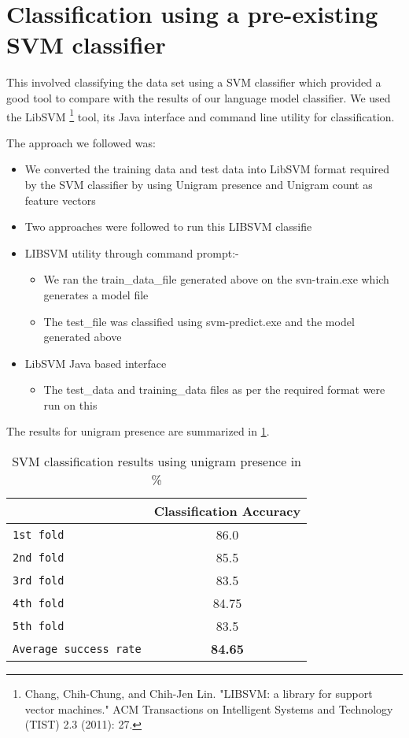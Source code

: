 \documentclass[paper=a4, fontsize=11pt]{scrartcl}
\numberwithin{equation}{section}		%
\numberwithin{figure}{section}			%
\numberwithin{table}{section}				%
\begin{document}

\section{Classification using a pre-existing SVM classifier}
This involved classifying the data set using a SVM classifier which provided a good tool to compare with the results of our language model classifier. We used the LibSVM \footnote{Chang, Chih-Chung, and Chih-Jen Lin. "LIBSVM: a library for support vector machines." ACM Transactions on Intelligent Systems and Technology (TIST) 2.3 (2011): 27.} tool, its Java interface and command line utility for classification.

The approach we followed was:
\begin {itemize}
      \item We converted the training data and test data into LibSVM format required by the SVM classifier by using Unigram presence and Unigram count as feature vectors
	\item Two approaches were followed to run this LIBSVM classifie			       
	\item LIBSVM utility through command prompt:-
        \begin{itemize}
        \item We ran the train\_data\_file generated above on the svn-train.exe which generates a model file
		\item The test\_file was classified using svm-predict.exe and the model generated above
		\end{itemize}
    \item LibSVM Java based interface
		\begin {itemize}
    	\item The test\_data and training\_data files as per the required format were run on this
       	\end {itemize}
		
\end{itemize}
    
The results for unigram presence are summarized in \ref{table:svm_uniP}.
\begin {table}[H]
\centering
\begin{tabular}{ |l||c|}
\hline
&{\bf Classification Accuracy}  \\ \hline
\texttt{1st fold} & 86.0  \\ \hline
\texttt{2nd fold} & 85.5 \\ \hline
\texttt{3rd fold} & 83.5 \\ \hline
\texttt{4th fold} & 84.75\\\hline
\texttt{5th fold} & 83.5 \\ \hline
\texttt{Average success rate} & {\bf 84.65}  \\ \hline
\end{tabular}
\caption{SVM classification results using unigram presence in \%} 
\label{table:svm_uniP}
\end {table}
\end{document}
